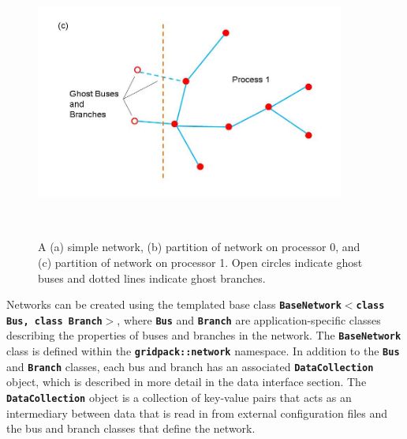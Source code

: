 \documentclass[12pt]{report} %
\begin{document}
\begin{figure}
    \includegraphics*[width=4in, height=3.55in, keepaspectratio=true]{Fig4c}
  \caption{ A (a) simple network, (b) partition of network on processor 0, and (c) partition of network on processor 1. Open circles indicate ghost buses and dotted lines indicate ghost branches.}
  \label{fig:fig-4}
\end{figure}





Networks can be created using the templated base class \texttt{\textbf{BaseNetwork$\boldsymbol{\mathrm{<}}$class Bus, class Branch$\boldsymbol{\mathrm{>}}$}}, where \texttt{\textbf{Bus}} and \texttt{\textbf{Branch}} are application-specific classes describing the properties of buses and branches in the network. The \texttt{\textbf{BaseNetwork}} class is defined within the \texttt{\textbf{gridpack::network}} namespace. In addition to the \texttt{\textbf{Bus}} and \texttt{\textbf{Branch}} classes, each bus and branch has an associated \texttt{\textbf{DataCollection}} object, which is described in more detail in the data interface section. The \texttt{\textbf{DataCollection}} object is a collection of key-value pairs that acts as an intermediary between data that is read in from external configuration files and the bus and branch classes that define the network.
\end{document}
